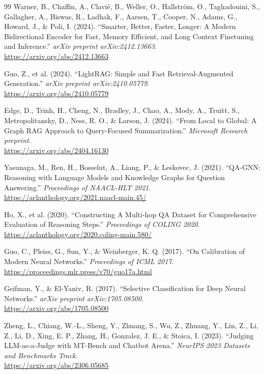 \documentclass[11pt, a4paper]{article}
\begin{document}
\begin{thebibliography}{99}
Warner, B., Chaffin, A., Clavi\'e, B., Weller, O., Hallstr\"om, O., Taghadouini, S., Gallagher, A., Biswas, R., Ladhak, F., Aarsen, T., Cooper, N., Adams, G., Howard, J., \& Poli, I. (2024).
``Smarter, Better, Faster, Longer: A Modern Bidirectional Encoder for Fast, Memory Efficient, and Long Context Finetuning and Inference.''
\textit{arXiv preprint arXiv:2412.13663}. \\
\url{https://arxiv.org/abs/2412.13663}

Guo, Z., et al. (2024).
``LightRAG: Simple and Fast Retrieval-Augmented Generation.''
\textit{arXiv preprint arXiv:2410.05779}. \\
\url{https://arxiv.org/abs/2410.05779}

Edge, D., Trinh, H., Cheng, N., Bradley, J., Chao, A., Mody, A., Truitt, S., Metropolitansky, D., Ness, R. O., \& Larson, J. (2024).
``From Local to Global: A Graph RAG Approach to Query-Focused Summarization.''
\textit{Microsoft Research preprint}. \\
\url{https://arxiv.org/abs/2404.16130}

Yasunaga, M., Ren, H., Bosselut, A., Liang, P., \& Leskovec, J. (2021).
``QA-GNN: Reasoning with Language Models and Knowledge Graphs for Question Answering.''
\textit{Proceedings of NAACL-HLT 2021}. \\
\url{https://aclanthology.org/2021.naacl-main.45/}

Ho, X., et al. (2020).
``Constructing A Multi-hop QA Dataset for Comprehensive Evaluation of Reasoning Steps.''
\textit{Proceedings of COLING 2020}. \\
\url{https://aclanthology.org/2020.coling-main.580/}

Guo, C., Pleiss, G., Sun, Y., \& Weinberger, K. Q. (2017).
``On Calibration of Modern Neural Networks.''
\textit{Proceedings of ICML 2017}. \\
\url{https://proceedings.mlr.press/v70/guo17a.html}

Geifman, Y., \& El-Yaniv, R. (2017).
``Selective Classification for Deep Neural Networks.''
\textit{arXiv preprint arXiv:1705.08500}. \\
\url{https://arxiv.org/abs/1705.08500}

Zheng, L., Chiang, W.-L., Sheng, Y., Zhuang, S., Wu, Z., Zhuang, Y., Lin, Z., Li, Z., Li, D., Xing, E. P., Zhang, H., Gonzalez, J. E., \& Stoica, I. (2023).
``Judging LLM-as-a-Judge with MT-Bench and Chatbot Arena.''
\textit{NeurIPS 2023 Datasets and Benchmarks Track}. \\
\url{https://arxiv.org/abs/2306.05685}

\end{thebibliography}
\end{document}
